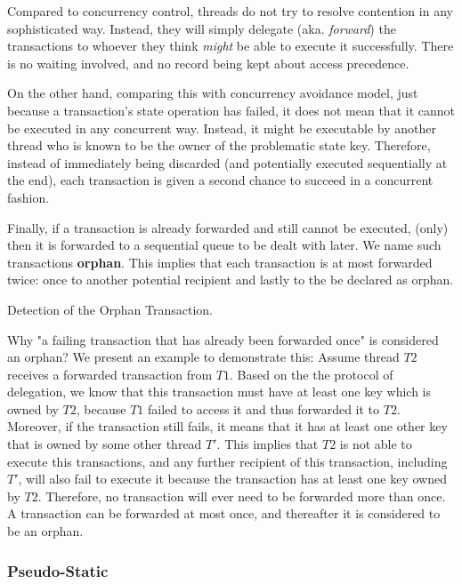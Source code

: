 Compared to concurrency control, threads do not try to resolve contention in any sophisticated way.
Instead, they will simply delegate (aka. \textit{forward}) the transactions to whoever they think
\textit{might} be able to execute it successfully. There is no waiting involved, and no record being
kept about access precedence.

On the other hand, comparing this with concurrency avoidance model, just because a transaction's
state operation has failed, it does not mean that it cannot be executed in any concurrent way.
Instead, it might be executable by another thread who is known to be the owner of the problematic
state key. Therefore, instead of immediately being discarded (and potentially executed sequentially
at the end), each transaction is given a second chance to succeed in a concurrent fashion.

Finally, if a transaction is already forwarded and still cannot be executed, (only) then it is
forwarded to a sequential queue to be dealt with later. We name such transactions \textbf{orphan}.
This implies that each transaction is at most forwarded twice: once to another potential recipient
and lastly to the be declared as orphan.

\begin{lemma}
	Detection of the Orphan Transaction.

	Why "a failing transaction that has already been forwarded once" is considered an orphan? We
	present an example to demonstrate this: Assume thread $T2$ receives a forwarded transaction from
	$T1$. Based on the the protocol of delegation, we know that this transaction must have at least
	one key which is owned by $T2$, because $T1$ failed to access it and thus forwarded it to $T2$.
	Moreover, if the transaction still fails, it means that it has at least one other key that is
	owned by some other thread $T'$. This implies that $T2$ is not able to execute this
	transactions, and any further recipient of this transaction, including $T'$, will also fail to
	execute it because the transaction has at least one key owned by $T2$. Therefore, no transaction
	will ever need to be forwarded more than once. A transaction can be forwarded at most once, and
	thereafter it is considered to be an orphan.
\end{lemma}

\subsubsection{Pseudo-Static}

